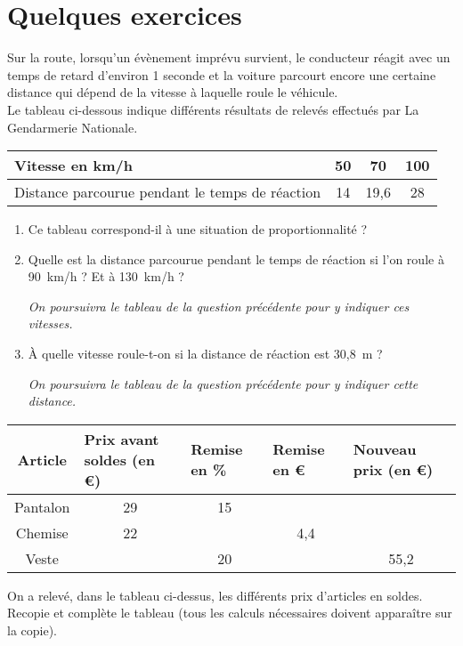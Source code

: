 \documentclass[10pt]{article}
\begin{document}
{\newpage



\section{Quelques exercices}
\begin{Exo}
Sur la route, lorsqu'un évènement imprévu survient, le conducteur
réagit avec un temps de retard d'environ 1 seconde et la voiture
parcourt encore une certaine distance qui dépend de la vitesse à
laquelle roule le véhicule.\\Le tableau ci-dessous indique différents
résultats de relevés effectués par La Gendarmerie Nationale.
\begin{center}
\begin{tabularx}{8cm}{|X|c|c|c|}
\hline
Vitesse en km/h&50&70&100\\
\hline
Distance parcourue pendant le temps de réaction&14&19,6&28\\
\hline
\end{tabularx}
\end{center}
\begin{enumerate}
\item Ce tableau correspond-il à une situation de proportionnalité ?
\item Quelle est la distance parcourue pendant le temps de réaction si
l'on roule à 90~km/h ? Et à 130~km/h ?\par{\em On
  poursuivra le tableau de la question précédente pour y indiquer ces vitesses.}
\item \`A quelle vitesse roule-t-on si la distance de réaction est
  30,8~m ?\par{\em On poursuivra le tableau de la question précédente
    pour y indiquer cette distance.}
\end{enumerate}
\end{Exo}

\begin{Exo}
\begin{center}
\begin{tabularx}{0.75\linewidth}{|c|X|X|X|X|}
\hline
Article&Prix avant soldes (en \euro{})&
Remise en \%&Remise en \euro{}&Nouveau prix (en \euro{})\\
\hline
Pantalon&\multicolumn{1}{c|}{29}&\multicolumn{1}{c|}{15}&&\\
\hline
Chemise&\multicolumn{1}{c|}{22}&&\multicolumn{1}{c|}{4,4}&\\
\hline
Veste&&\multicolumn{1}{c|}{20}&&\multicolumn{1}{c|}{55,2}\\
\hline
\end{tabularx}
\end{center}
 On a relevé, dans le tableau ci-dessus, les différents prix
 d'articles en soldes.\\Recopie et complète le tableau (tous les
 calculs nécessaires doivent apparaître sur la copie).
\end{Exo}

}
\end{document}
